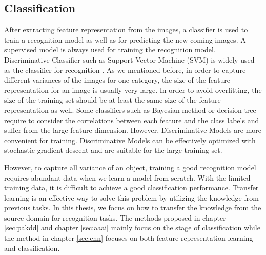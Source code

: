 \subsection{Classification}
After extracting feature representation from the images, a classifier is used to train a recognition model as well as for predicting the new coming images. A supervised model is always used for training the recognition model. Discriminative Classifier such as Support Vector Machine (SVM) is widely used as the classifier for recognition \cite{cristianini2000introduction}. As we mentioned before, in order to capture different variances of the images for one category, the size of the feature representation for an image is usually very large. In order to avoid overfitting, the size of the training set should be at least the same size of the feature representation as well. Some classifiers such as Bayesian method or decision tree require to consider the correlations between each feature and the class labels and suffer from the large feature dimension. However, Discriminative Models\cite{bottou2010large} are more convenient for training. Discriminative Models can be effectively optimized with stochastic gradient descent and are suitable for the large training set. 

However, to capture all variance of an object, training a good recognition model requires abundant data when we learn a model from scratch. With the limited training data, it is difficult to achieve a good classification performance. Transfer learning is an effective way to solve this problem by utilizing the knowledge from previous tasks. In this thesis, we focus on how to transfer the knowledge from the source domain for recognition tasks. The methods proposed in chapter \ref{sec:pakdd} and chapter \ref{sec:aaai} mainly focus on the stage of classification while the method in chapter \ref{sec:cnn} focuses on both feature representation learning and classification.



